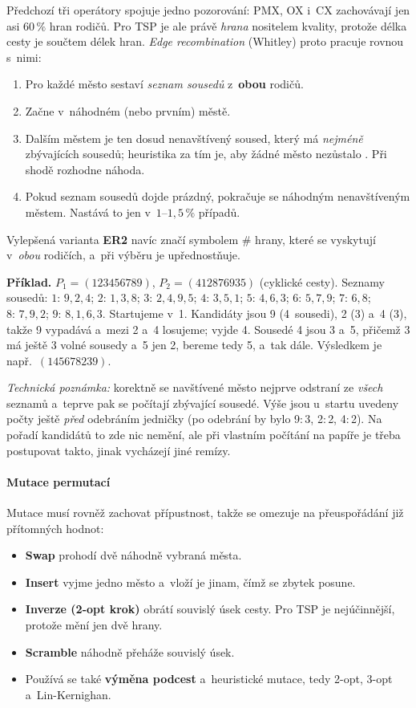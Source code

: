 \documentclass[11pt,a4paper]{article}
\theoremstyle{definition}
\begin{document}
Předchozí tři operátory spojuje jedno pozorování: PMX, OX i~CX zachovávají jen asi
$60\,\%$ hran rodičů. Pro TSP je ale právě \emph{hrana} nositelem kvality, protože délka
cesty je součtem délek hran. \emph{Edge recombination} (Whitley) proto pracuje rovnou
s~nimi:
\begin{enumerate}
\item Pro každé město sestaví \emph{seznam sousedů} z~\textbf{obou} rodičů.
\item Začne v~náhodném (nebo prvním) městě.
\item Dalším městem je ten dosud nenavštívený soused, který má \emph{nejméně}
  zbývajících sousedů; heuristika za tím je, aby žádné město nezůstalo .
  Při shodě rozhodne náhoda.
\item Pokud seznam sousedů dojde prázdný, pokračuje se náhodným nenavštíveným
  městem. Nastává to jen v~$1$--$1{,}5\,\%$ případů.
\end{enumerate}
Vylepšená varianta \textbf{ER2} navíc značí symbolem \# hrany, které se vyskytují
v~\emph{obou} rodičích, a~při výběru je upřednostňuje.

\textbf{Příklad.} $P_1 = (123456789)$, $P_2 = (412876935)$ (cyklické cesty).
Seznamy sousedů: $1{:}\,9,2,4$; $2{:}\,1,3,8$; $3{:}\,2,4,9,5$; $4{:}\,3,5,1$;
$5{:}\,4,6,3$; $6{:}\,5,7,9$; $7{:}\,6,8$; $8{:}\,7,9,2$; $9{:}\,8,1,6,3$.
Startujeme v~1. Kandidáty jsou 9 (4~sousedi), 2 (3) a~4 (3), takže 9 vypadává a~mezi
2 a~4 losujeme; vyjde 4. Sousedé 4 jsou 3 a~5, přičemž 3 má ještě 3 volné sousedy
a~5 jen 2, bereme tedy 5, a~tak dále. Výsledkem je např.\ $(145678239)$.

\emph{Technická poznámka:} korektně se navštívené město nejprve odstraní ze
\emph{všech} seznamů a~teprve pak se počítají zbývající sousedé. Výše jsou u~startu
uvedeny počty ještě \emph{před} odebráním jedničky (po odebrání by bylo 9$:$3, 2$:$2,
4$:$2). Na pořadí kandidátů to zde nic nemění, ale při vlastním počítání na papíře je
třeba postupovat takto, jinak vycházejí jiné remízy.

\paragraph{Mutace permutací}

Mutace musí rovněž zachovat přípustnost, takže se omezuje na přeuspořádání již
přítomných hodnot:
\begin{itemize}
\item \textbf{Swap} prohodí dvě náhodně vybraná města.
\item \textbf{Insert} vyjme jedno město a~vloží je jinam, čímž se zbytek posune.
\item \textbf{Inverze (2-opt krok)} obrátí souvislý úsek cesty. Pro TSP je nejúčinnější,
  protože mění jen dvě hrany.
\item \textbf{Scramble} náhodně přeháže souvislý úsek.
\item Používá se také \textbf{výměna podcest} a~heuristické mutace, tedy 2-opt, 3-opt
  a~Lin-Kernighan.
\end{itemize}
\end{document}
